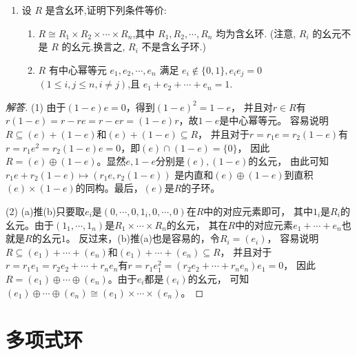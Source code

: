 \begin{enumerate}
\begin{enumerate}[label=(\arabic*)]
    \item 设 $ R $ 是含幺环,证明下列条件等价:
    \begin{enumerate}[label=(\alph*)]
        \item $ R \cong R_1 \times R_2 \times \cdots \times R_n $,其中 $ R_1, R_2, \cdots, R_n $ 均为含幺环. (注意, $ R_i $ 的幺元不是 $ R $ 的幺元.换言之, $ R_i $ 不是含幺子环.)
        \item $ R $ 有中心幂等元 $ e_1, e_2, \cdots, e_n $ 满足 $ e_i \notin \{0,1\}, e_i e_j = 0$ $(1 \leqslant i, j \leqslant n, i \neq j) $,且 $ e_1 + e_2 + \cdots + e_n = 1 $.
    \end{enumerate}
\end{enumerate}
\begin{proof}[解答]
    (1) 由于$(1-e)e=0$，得到$(1-e)^2=1-e$，
    并且对$r \in R$有$r(1-e)=r-re=r-er=(1-e)r$，故$1-e$是中心幂等元。
    容易说明$R \subseteq (e)+(1-e)$和$(e)+(1-e) \subseteq R$，
    并且对于$r=r_1e=r_2(1-e)$有$r=r_1e^2=r_2(1-e)e=0$，即$(e)\cap(1-e)=\{0\}$，
    因此$R=(e)\oplus(1-e)$。显然$e,1-e$分别是$(e),(1-e)$的幺元，
    由此可知$r_1e+r_2(1-e)\mapsto(r_1e,r_2(1-e))$
    是内直和$(e)\oplus(1-e)$到直积$(e)\times(1-e)$的同构。最后，$(e)$是$R$的子环。

    (2) (a)推(b)只要取$e_i$是$(0,\cdots,0,1_i,0,\cdots,0)$在$R$中的对应元素即可，
    其中$1_i$是$R_i$的幺元。由于$(1_1,\cdots,1_n)$是$R_1 \times\cdots\times R_n$的幺元，
    其在$R$中的对应元素$e_1+\cdots+e_n$也就是$R$的幺元$1$。
    反过来，(b)推(a)也是容易的，令$R_i=(e_i)$，
    容易说明$R \subseteq (e_1)+\cdots+(e_n)$和$(e_1)+\cdots+(e_n) \subseteq R$，
    并且对于$r=r_1e_1=r_2e_2+\cdots+r_ne_n$有$r=r_1e_1^2=(r_2e_2+\cdots+r_ne_n)e_1=0$，
    因此$R=(e_1)\oplus\cdots\oplus(e_n)$。由于$e_i$都是$(e_i)$的幺元，
    可知$(e_1)\oplus\cdots\oplus(e_n)\cong(e_1)\times\cdots\times(e_n)$。
\end{proof}
\end{enumerate}

\section{多项式环}

